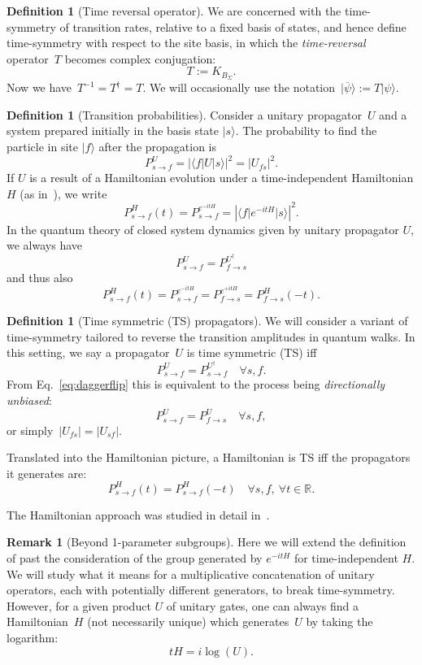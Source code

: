 \documentclass[aps,pra,12pt,nofootinbib,superscriptaddress,longbibliography,showpacs]{revtex4-1}
\theoremstyle{plain}
\theoremstyle{definition}
\newtheorem{definition}[theorem]{Definition}
\newtheorem{remark}[theorem]{Remark}
\newcommand{\bra}[1]{\mbox{$\langle #1|$}}
\newcommand{\ket}[1]{\ensuremath{|#1\rangle}}
\newcommand{\R}{{\mathbb R}}  %
\newcommand{\be}{\begin{equation}}
\newcommand{\ee}{\end{equation}}
\begin{document}
\begin{definition}[Time reversal operator]
We are concerned with the time-symmetry of transition
rates, relative to a fixed basis of states, and hence define time-symmetry
with respect to the site basis, in which the \emph{time-reversal} operator~$T$ becomes
complex conjugation:
\be
T := K_{B_\Sigma}.
\ee
Now we have~$T^{-1} = T^\dagger = T$.
We will occasionally use the notation~$\ket{\overline{\psi}} := T\ket{\psi}$.
\end{definition}





\begin{definition}[Transition probabilities]
Consider a unitary propagator~$U$ and a system prepared initially in
the basis state $\ket{s}$.  The probability to find the particle
in site $\ket{f}$ after the propagation is
\be
\label{eq:Pdef}
P^U_{s\to f} = |\bra{f} U \ket{s}|^2 = |U_{fs}|^2.
\ee
If $U$ is a result of a Hamiltonian evolution under a time-independent
Hamiltonian $H$ (as in~\cite{Z12}),
we write
\be
P^H_{s\to f}(t) = 
P^{e^{-itH}}_{s\to f} = 
|\bra{f} e^{-itH} \ket{s}|^2.
\ee
In the quantum theory of closed system dynamics given by unitary propagator $U$, we always have
\be
\label{eq:daggerflip}
P^U_{s\to f} = P^{U^\dagger}_{f\to s}
\ee
and thus also
\be
P^H_{s\to f}(t) =
P^{e^{-itH}}_{s\to f} =
P^{e^{+itH}}_{f\to s} = 
P^H_{f\to s}(-t).
\ee
\end{definition} 

\begin{definition}[Time symmetric (TS) propagators] \label{def:time-symmetry} 
We will consider a variant of time-symmetry tailored to reverse the
transition amplitudes in quantum walks.  In this setting, we say a
propagator~$U$ is time symmetric (TS) iff
\be
\label{eq:ts}
P^U_{s\to f} = P^{U^\dagger}_{s\to f} \quad \forall s, f.
\ee
From Eq.~\eqref{eq:daggerflip} this 
is equivalent to the process being \emph{directionally unbiased}:
\be
\label{eq:du}
P^U_{s\to f} = P^{U}_{f\to s} \quad \forall s, f,
\ee
or simply~$|U_{fs}| = |U_{sf}|$.

Translated into the Hamiltonian picture, a Hamiltonian is TS iff
the propagators it generates are: 
\be
P^H_{s\to f}(t) = P^H_{s\to f}(-t) \quad \forall s, f,  \: \forall t \in \R.
\ee

The Hamiltonian approach was studied in detail in~\cite{Z12}. 
\end{definition} 


\begin{remark}[Beyond 1-parameter subgroups] 

Here we will extend the definition of \cite{Z12} past the
consideration of the group generated by $e^{-it H}$ for
time-independent $H$.  We will study what it means for a multiplicative concatenation of
unitary operators, each with potentially different generators, to
break time-symmetry.  However, for a given product $U$ of unitary
gates, one can always find a Hamiltonian~$H$ (not necessarily unique)
which generates~$U$ by taking the logarithm:
\be
t H = i \log(U). %
\ee
\end{remark}  
\end{document}
